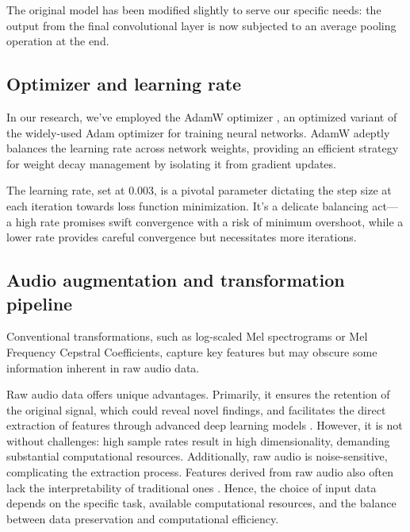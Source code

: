 The original model has been modified slightly to serve our specific needs: the output from the final convolutional layer is now subjected to an average pooling operation at the end.



\subsection{Optimizer and learning rate}

In our research, we've employed the AdamW optimizer \cite{Loshchilov2017DecoupledRegularization}, an optimized variant of the widely-used Adam optimizer for training neural networks. AdamW adeptly balances the learning rate across network weights, providing an efficient strategy for weight decay management by isolating it from gradient updates. 

The learning rate, set at 0.003, is a pivotal parameter dictating the step size at each iteration towards loss function minimization. It's a delicate balancing act— a high rate promises swift convergence with a risk of minimum overshoot, while a lower rate provides careful convergence but necessitates more iterations.


\subsection{Audio augmentation and transformation pipeline}

Conventional transformations, such as log-scaled Mel spectrograms or Mel Frequency Cepstral Coefficients, capture key features but may obscure some information inherent in raw audio data.

Raw audio data offers unique advantages. Primarily, it ensures the retention of the original signal, which could reveal novel findings, and facilitates the direct extraction of features through advanced deep learning models \cite{learning}. However, it is not without challenges: high sample rates result in high dimensionality, demanding substantial computational resources. Additionally, raw audio is noise-sensitive, complicating the extraction process. Features derived from raw audio also often lack the interpretability of traditional ones \cite{Schindler2020DeepTutorial}. Hence, the choice of input data depends on the specific task, available computational resources, and the balance between data preservation and computational efficiency.

